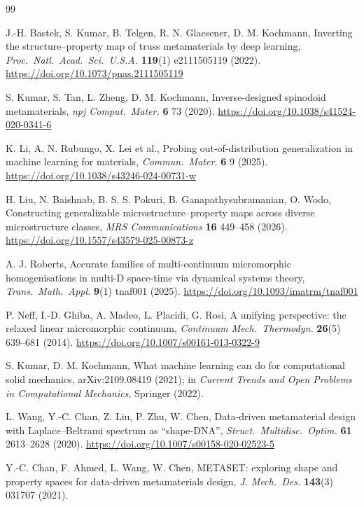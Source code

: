 \documentclass[11pt,a4paper]{article}
\begin{document}
\begin{thebibliography}{99}\small\raggedright

 J.-H. Bastek, S. Kumar, B. Telgen, R. N. Glaesener, D. M. Kochmann,
Inverting the structure--property map of truss metamaterials by deep learning,
\emph{Proc.\ Natl.\ Acad.\ Sci.\ U.S.A.} \textbf{119}(1) e2111505119 (2022).
\url{https://doi.org/10.1073/pnas.2111505119}

 S. Kumar, S. Tan, L. Zheng, D. M. Kochmann, Inverse-designed spinodoid
metamaterials, \emph{npj Comput.\ Mater.} \textbf{6} 73 (2020).
\url{https://doi.org/10.1038/s41524-020-0341-6}

 K. Li, A. N. Rubungo, X. Lei et al., Probing out-of-distribution
generalization in machine learning for materials, \emph{Commun.\ Mater.} \textbf{6} 9
(2025). \url{https://doi.org/10.1038/s43246-024-00731-w}

 H. Liu, N. Baishnab, B. S. S. Pokuri, B. Ganapathysubramanian, O. Wodo,
Constructing generalizable microstructure--property maps across diverse microstructure
classes, \emph{MRS Communications} \textbf{16} 449--458 (2026).
\url{https://doi.org/10.1557/s43579-025-00873-z}

 A. J. Roberts, Accurate families of multi-continuum micromorphic
homogenisations in multi-D space-time via dynamical systems theory, \emph{Trans.\ Math.\
Appl.} \textbf{9}(1) tnaf001 (2025). \url{https://doi.org/10.1093/imatrm/tnaf001}

 P. Neff, I.-D. Ghiba, A. Madeo, L. Placidi, G. Rosi, A unifying
perspective: the relaxed linear micromorphic continuum, \emph{Continuum Mech.\ Thermodyn.}
\textbf{26}(5) 639--681 (2014). \url{https://doi.org/10.1007/s00161-013-0322-9}

 S. Kumar, D. M. Kochmann, What machine learning can do for
computational solid mechanics, arXiv:2109.08419 (2021); in \emph{Current Trends and Open
Problems in Computational Mechanics}, Springer (2022).

 L. Wang, Y.-C. Chan, Z. Liu, P. Zhu, W. Chen, Data-driven metamaterial
design with Laplace--Beltrami spectrum as ``shape-DNA'', \emph{Struct.\ Multidisc.\ Optim.}
\textbf{61} 2613--2628 (2020). \url{https://doi.org/10.1007/s00158-020-02523-5}

 Y.-C. Chan, F. Ahmed, L. Wang, W. Chen, METASET: exploring shape and
property spaces for data-driven metamaterials design, \emph{J. Mech.\ Des.} \textbf{143}(3)
031707 (2021).


\end{thebibliography}
\end{document}
